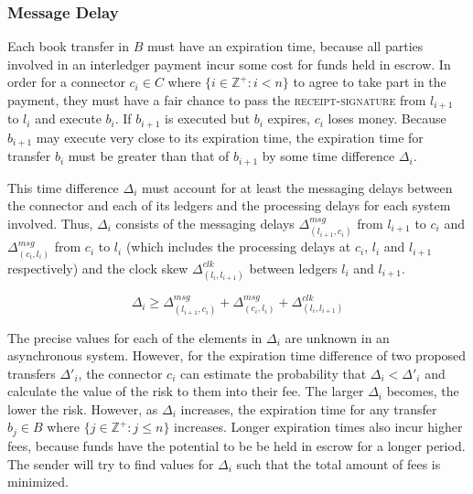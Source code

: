 \documentclass[letterpaper,twocolumn,10pt]{article}
\begin{document}
\subsubsection{Message Delay}
\label{sssec:messaging-delay}



Each book transfer in $B$ must have an expiration time, because all parties involved in an interledger payment incur some cost for funds held in escrow. In order for a connector $c_i \in C$ where $ \{ i \in \mathbb{Z}^+ : i < n \} $ to agree to take part in the payment, they must have a fair chance to pass the \textsc{receipt-signature} from $l_{i+1}$ to $l_i$ and execute $b_i$. If $b_{i+1}$ is executed but $b_i$ expires, $c_i$ loses money. Because $b_{i+1}$ may execute very close to its expiration time, the expiration time for transfer $b_i$ must be greater than that of $b_{i+1}$ by some time difference $\Delta_i$.

This time difference $\Delta_i$ must account for at least the messaging delays between the connector and each of its ledgers and the processing delays for each system involved. Thus, $\Delta_i$ consists of the messaging delays $\Delta^{msg}_{(l_{i+1}, c_i)}$ from $l_{i+1}$ to $c_i$ and $\Delta^{msg}_{(c_i, l_i)}$ from $c_i$ to $l_i$ (which includes the processing delays at $c_i$, $l_i$ and $l_{i+1}$ respectively) and the clock skew $\Delta^{clk}_{(l_i, l_{i+1})}$ between ledgers $l_i$ and $l_{i+1}$.

\begin{equation}
\Delta_i \geq \Delta^{msg}_{(l_{i+1}, c_i)} + \Delta^{msg}_{(c_i, l_i)} + \Delta^{clk}_{(l_i, l_{i+1})}
\end{equation}

The precise values for each of the elements in $\Delta_i$ are unknown in an asynchronous system. However, for the expiration time difference of two proposed transfers $\Delta'_i$, the connector $c_i$ can estimate the probability that $\Delta_i < \Delta'_i$ and calculate the value of the risk to them into their fee. The larger $\Delta_i$ becomes, the lower the risk. However, as $\Delta_i$ increases, the expiration time for any transfer $b_j \in B$ where $ \{ j \in \mathbb{Z}^+ : j \leq n \} $ increases. Longer expiration times also incur higher fees, because funds have the potential to be be held in escrow for a longer period. The sender will try to find values for $\Delta_i$ such that the total amount of fees is minimized.
\end{document}
